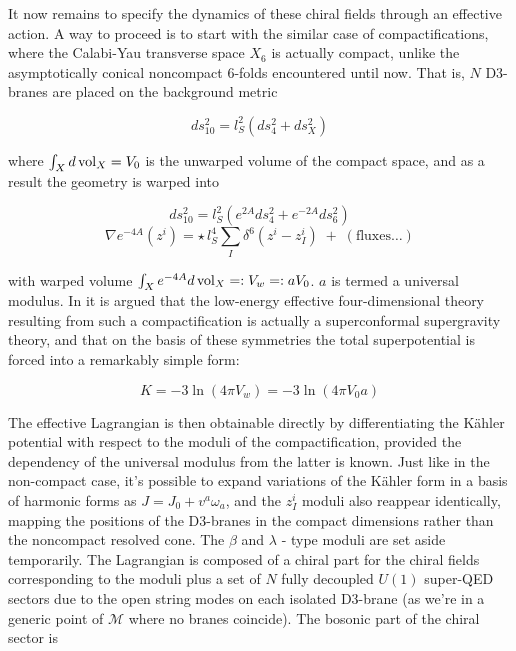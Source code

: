 It now remains to specify the dynamics of these chiral fields through an effective action. A way to proceed is to start with the similar case of compactifications\cite{MZ_2}, where the Calabi-Yau transverse space $X_6$ is actually compact, unlike the asymptotically conical noncompact 6-folds encountered until now. That is, $N$ D3-branes are placed on the background metric

\begin{equation}
	ds_{10}^2 = l_S^2 (ds^2_4 + ds^2_X)
	\label{}
\end{equation}

where $\int_X d\operatorname{vol}_X = V_0$ is the unwarped volume of the compact space, and as a result the geometry is warped into

\begin{equation}
	ds_{10}^2 = l_S^2 ( e^{2A} ds^2_4 + e^{-2A} ds^2_6 )
\end{equation}
\begin{equation}
	\nabla e^{-4A}(z^i) = \star \, l_S^4 \sum_I \delta^6(z^i - z_I^i) \; + \; (\text {fluxes}\ldots)
	\label{}
\end{equation}

with warped volume $\int_X e^{-4A} d\operatorname{vol}_X =: V_w =: a V_0$. $a$ is termed a universal modulus. In \cite{MZ_2} it is argued that the low-energy effective four-dimensional theory resulting from such a compactification is actually a superconformal supergravity theory, and that on the basis of these symmetries the total superpotential is forced into a remarkably simple form:

\begin{equation}
	K = -3 \ln(4\pi V_w) = -3 \ln(4 \pi V_0 a)	
	\label{}
\end{equation}

The effective Lagrangian is then obtainable directly by differentiating the K\"ahler potential with respect to the moduli of the compactification, provided the dependency of the universal modulus from the latter is known. Just like in the non-compact case, it's possible to expand variations of the K\"ahler form in a basis of harmonic forms as $J = J_0 + v^a \omega_a$, and the $z_I^i$ moduli also reappear identically, mapping the positions of the D3-branes in the compact dimensions rather than the noncompact resolved cone. The $\beta$ and $\lambda$ - type moduli are set aside temporarily. The Lagrangian is composed of a chiral part for the chiral fields corresponding to the moduli plus a set of $N$ fully decoupled $U(1)$ super-QED sectors due to the open string modes on each isolated D3-brane (as we're in a generic point of $\mathcal{M}$ where no branes coincide). The bosonic part of the chiral sector is

